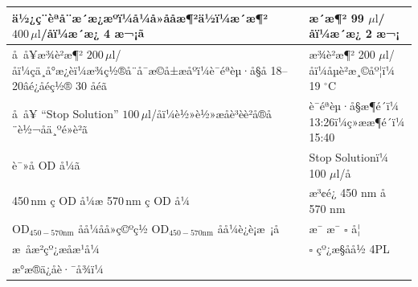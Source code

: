 \documentclass[UTF8,10pt,a4paper,fontset=fandol]{ctexart}
\newcommand{\fieldvalue}[1]{#1}
\newcommand{\handwritten}[1]{#1}
\begin{document}
\begin{tabularx}{\textwidth}{|p{}|X|}
\hline
ä½¿ç¨èªå¨æ´æ¿æºï¼å¼å»å­åæ¶²ä½ï¼æ´æ¶² $400\,\mu\mathrm{l}$/å­ï¼æ´æ¿ 4 æ¬¡ã &
æ´æ¶²
\fieldvalue{\handwritten{99}} $\mu\mathrm{l}$/å­ï¼æ´æ¿
\fieldvalue{\handwritten{2}} æ¬¡ \\
\hline
å å¥æ¾è²æ¶² $200\,\mu\mathrm{l}$/å­ï¼çä¸å°æ¿èï¼æ¾ç½®å¨å¯æ©å±æåºï¼è¯éªèµ·å§å 18--20âé¿åéç½® 30 åéã &
æ¾è²æ¶²
\fieldvalue{\handwritten{200}} $\mu\mathrm{l}$/å­ï¼å­µè²æ¸©åº¦ï¼
\fieldvalue{\handwritten{19}} $^\circ\mathrm{C}$ \\
\hline
å å¥ ``Stop Solution'' $100\,\mu\mathrm{l}$/å­ï¼è½»è½»æåè³èè²å®å¨è½¬åä¸ºé»è²ã &
è¯éªèµ·å§æ¶é´ï¼
\fieldvalue{\handwritten{13:26}}ï¼ç»ææ¶é´ï¼
\fieldvalue{\handwritten{15:40}} \\
\hline
è¯»å OD å¼ã &
Stop Solutionï¼
\fieldvalue{\handwritten{100}} $\mu\mathrm{l}$/å­ \\
\hline
450\,nm ç OD å¼æ 570\,nm ç OD å¼ &
æ³¢é¿
\fieldvalue{\handwritten{450}} nm å
\fieldvalue{\handwritten{570}} nm \\
\hline
OD$_{450-570\mathrm{nm}}$ åå¼åå»ç©ºç½ OD$_{450-570\mathrm{nm}}$ åå¼è¿è¡æ ¡å &
æ¯
\fieldvalue{\handwritten{æ¯}} \quad $\square$ å¦ \\
\hline
æ åæ²çº¿æåæ¹å¼ &
$\square$ çº¿æ§åå½ \quad
\fieldvalue{\handwritten{4PL}} \\
\hline
\multicolumn{2}{|l|}{æ°æ®ä¿å­è·¯å¾ï¼
}
\end{tabularx}
\end{document}
